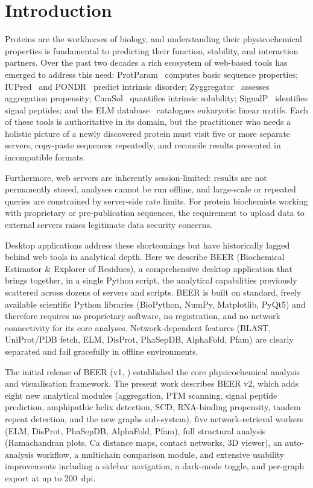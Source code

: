 \documentclass[12pt]{article}
\begin{document}
\section{Introduction}
\label{sec:intro}

Proteins are the workhorses of biology, and understanding their physicochemical
properties is fundamental to predicting their function, stability, and
interaction partners.
Over the past two decades a rich ecosystem of web-based tools has emerged to
address this need: ProtParam~\citep{gasteiger2005} computes basic sequence
properties; IUPred~\citep{dosztanyi2005} and PONDR~\citep{romero2001} predict
intrinsic disorder; Zyggregator~\citep{tartaglia2008} assesses aggregation
propensity; CamSol~\citep{sormanni2015} quantifies intrinsic solubility;
SignalP~\citep{almagro2019} identifies signal peptides; and the ELM
database~\citep{kumar2020} catalogues eukaryotic linear motifs.
Each of these tools is authoritative in its domain, but the practitioner who
needs a holistic picture of a newly discovered protein must visit five or more
separate servers, copy-paste sequences repeatedly, and reconcile results
presented in incompatible formats.

Furthermore, web servers are inherently session-limited: results are not
permanently stored, analyses cannot be run offline, and large-scale or
repeated queries are constrained by server-side rate limits.
For protein biochemists working with proprietary or pre-publication sequences,
the requirement to upload data to external servers raises legitimate data
security concerns.

Desktop applications address these shortcomings but have historically
lagged behind web tools in analytical depth.
Here we describe BEER (Biochemical Estimator \& Explorer of Residues), a
comprehensive desktop application that brings together, in a single Python
script, the analytical capabilities previously scattered across dozens of
servers and scripts.
BEER is built on standard, freely available scientific Python libraries
(BioPython, NumPy, Matplotlib, PyQt5) and therefore requires no proprietary
software, no registration, and no network connectivity for its core analyses.
Network-dependent features (BLAST, UniProt/PDB fetch, ELM, DisProt,
PhaSepDB, AlphaFold, Pfam) are clearly separated and fail gracefully in
offline environments.

The initial release of BEER (v1, \citealt{mukherjee2025}) established the
core physicochemical analysis and visualisation framework.
The present work describes BEER v2, which adds eight new analytical modules
(aggregation, PTM scanning, signal peptide prediction, amphipathic helix
detection, SCD, RNA-binding propensity, tandem repeat detection, and the
new graphs sub-system), five network-retrieval workers (ELM, DisProt,
PhaSepDB, AlphaFold, Pfam), full structural analysis (Ramachandran plots,
Ca distance maps, contact networks, 3D viewer), an auto-analysis workflow,
a multichain comparison module, and extensive usability improvements
including a sidebar navigation, a dark-mode toggle, and per-graph export at
up to 200~dpi.
\end{document}
